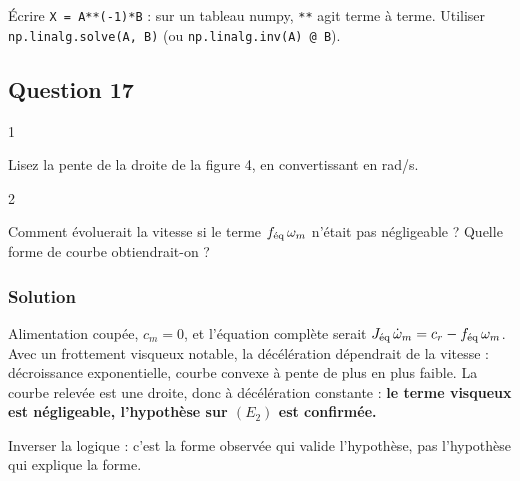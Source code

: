 \documentclass[11pt,a4paper]{article}
\newcommand{\equationajustee}[1]{%
  \sbox{\boiteequation}{$\displaystyle #1$}%
  \ifdim\wd\boiteequation>\linewidth
    \[\resizebox{\linewidth}{!}{\usebox{\boiteequation}}\]%
  \else
    \[#1\]%
  \fi}
\begin{document}
\begin{piege}

Écrire \texttt{X\ =\ A**(-1)*B} : sur un tableau numpy, \texttt{**} agit terme à terme. Utiliser \texttt{np.linalg.solve(\allowbreak{}A,\allowbreak{}\ B)\allowbreak{}} (ou \texttt{np.linalg.inv(\allowbreak{}A)\allowbreak{}\ @\ B}).

\end{piege}

\hypertarget{question-17}{%
\subsection{Question 17}\label{question-17}}

\begin{indication}{1}

Lisez la pente de la droite de la figure 4, en convertissant en rad/s.

\end{indication}

\begin{indication}{2}

Comment évoluerait la vitesse si le terme \(f_{\text{\text{éq}}}\,\omega_m\) n'était pas négligeable ? Quelle forme de courbe obtiendrait-on ?

\end{indication}

\hypertarget{solution-16}{%
\subsubsection{Solution}\label{solution-16}}

\equationajustee{\boxed{\frac{\mathrm d\omega_m}{\mathrm dt}=-\frac{\pi\,N_0}{30\,t_f}}\quad\text{sur }[0\,;t_f].}

Alimentation coupée, \(c_m=0\), et l'équation complète serait \(J_{\text{\text{éq}}}\,\dot\omega_m=c_r-f_{\text{\text{éq}}}\,\omega_m\). Avec un frottement visqueux notable, la décélération dépendrait de la vitesse : décroissance exponentielle, courbe convexe à pente de plus en plus faible. La courbe relevée est une droite, donc à décélération constante : \textbf{le terme visqueux est négligeable, l'hypothèse sur \((E_2)\) est confirmée.}

\begin{piege}

Inverser la logique : c'est la forme observée qui valide l'hypothèse, pas l'hypothèse qui explique la forme.

\end{piege}
\end{document}
